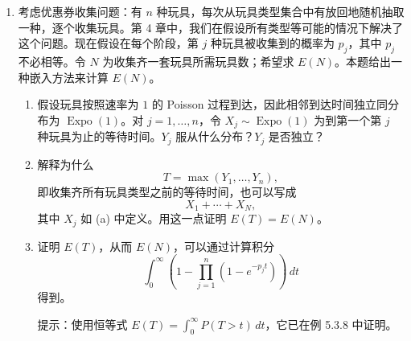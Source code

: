 \documentclass[UTF8,12pt,a4paper,fontset=fandol]{ctexart}
\begin{document}
\begin{enumerate}
  \item 考虑优惠券收集问题：有 $n$ 种玩具，每次从玩具类型集合中有放回地随机抽取一种，逐个收集玩具。第 4 章中，我们在假设所有类型等可能的情况下解决了这个问题。现在假设在每个阶段，第 $j$ 种玩具被收集到的概率为 $p_j$，其中 $p_j$ 不必相等。令 $N$ 为收集齐一套玩具所需玩具数；希望求 $E(N)$。本题给出一种嵌入方法来计算 $E(N)$。
  \begin{enumerate}
    \item 假设玩具按照速率为 $1$ 的 Poisson 过程到达，因此相邻到达时间独立同分布为 $\operatorname{Expo}(1)$。对 $j=1,\ldots,n$，令 $X_j\sim\operatorname{Expo}(1)$ 为到第一个第 $j$ 种玩具为止的等待时间。$Y_j$ 服从什么分布？$Y_j$ 是否独立？
    \item 解释为什么
    \[
      T=\max(Y_1,\ldots,Y_n),
    \]
    即收集齐所有玩具类型之前的等待时间，也可以写成
    \[
      X_1+\cdots+X_N,
    \]
    其中 $X_j$ 如 (a) 中定义。用这一点证明 $E(T)=E(N)$。
    \item 证明 $E(T)$，从而 $E(N)$，可以通过计算积分
    \[
      \int_0^\infty
      \left(1-\prod_{j=1}^{n}(1-e^{-p_jt})\right)\,dt
    \]
    得到。

    提示：使用恒等式 $E(T)=\int_0^\infty P(T>t)\,dt$，它已在例 5.3.8 中证明。
  \end{enumerate}
\end{enumerate}
\end{document}
